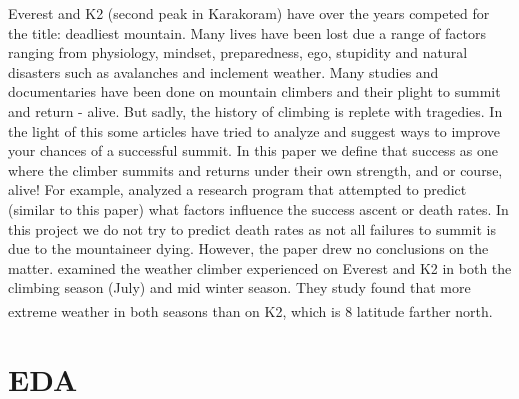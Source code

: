 \documentclass[stu,12pt,floatsintext]{apa7}
\begin{document}
Everest and K2 (second peak in Karakoram) have over the years competed for the title: deadliest mountain. Many lives have been lost due a range of factors ranging from physiology, mindset, preparedness, ego, stupidity and natural disasters such as avalanches and inclement weather. Many studies and documentaries have been done on mountain climbers and their plight to summit and return - alive. But sadly, the history of climbing is replete with tragedies. In the light of this some articles have tried to analyze and suggest ways to improve your chances of a successful summit. In this paper we define that success as one where the climber summits and returns under their own strength, and or course, alive! For example, \textcite{huey_mountaineering_2001} analyzed a research program that attempted to predict (similar to this paper) what factors influence the success ascent or death rates. In this project we do not try to predict death rates as not all failures to summit is due to the mountaineer dying. However, the paper drew no conclusions on the matter. \textcite{szymczak_comparison_2021} examined the weather climber experienced on Everest and K2 in both the climbing season (July) and mid winter season. They study found that more extreme weather in both seasons than on K2, which is \si{8^{\circ}} latitude farther north.


\section{EDA}
\end{document}
